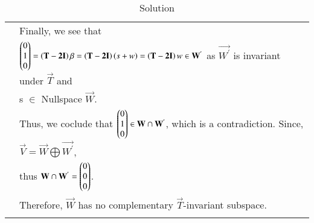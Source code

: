 \begin{table*}[!ht]
\begin{tabular}{|l|l|}
        & Finally, we see that\\
        &  $\begin{pmatrix}0 \\ 1 \\0\end{pmatrix}= \left(\mathbf{T-2I}\right)\beta = \left(\mathbf{T-2I}\right)\left(s + w\right) =  \left(\mathbf{T-2I}\right)w \in \mathbf{W^{'}} $ as $\vec{W^{'}}$ is invariant under $\vec{T}$ and \\
        & s $\in$ Nullspace $\vec{W}$.\\
        & Thus, we coclude that $\begin{pmatrix}0 \\ 1 \\ 0\end{pmatrix} \in \mathbf{W} \cap \mathbf{W^{'}}$, which is a contradiction. Since, $\vec{V} = \vec{W} \bigoplus \vec{W^{'}}$,  \\
        & thus $\mathbf{W} \cap \mathbf{W^{'}} = \begin{pmatrix}0 \\ 0 \\0\end{pmatrix}$. \\
        & Therefore, $\vec{W}$ has no complementary $\vec{T}$-invariant subspace. \\
        & \\
		\hline
	\end{tabular}
\caption{Solution}
\label{eq:solutions/7/2/3/table1}
\end{table*}	
